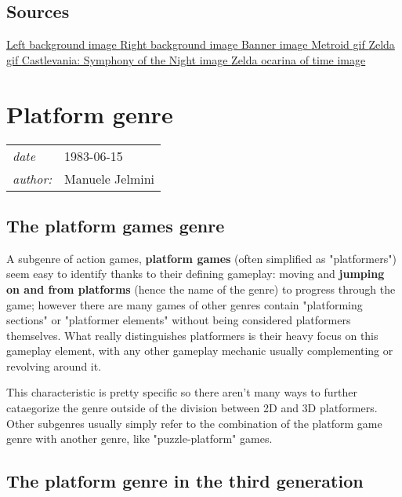 \documentclass[a4paper,10pt]{book}
\newcommand{\pageHeader}[4]{
    \section{#1}
    \vspace{-0.3cm}
    \begin{table}[h!]
     \begin{tabular}{ll}
        \hline
        \textit{date} & #2 \\
        \textit{author: } & #3\\
        \hline
     \end{tabular}
    \end{table}
    \vspace{-0.3cm}
}
\begin{document}
 \subsection{Sources }
 
 \href{https://wallpapercave.com/wp/1fAetMy.jpg}{Left background image }  
 \href{https://wallup.net/wp-content/uploads/2017/11/10/81873-Super_Metroid-Samus_Aran-Metroid.jpg}{Right background image }  
 \href{https://1.bp.blogspot.com/-R0SJfAZjA6Q/VwkYrLqWkaI/AAAAAAAAHQU/agSX_eiWTXYAOQwhgADUZwDyNv2FqXjRA/s640/action-adventure-games.jpg}{Banner image }  
 \href{https://66.media.tumblr.com/2a4ab22c6c0c318c2afd961664983266/tumblr_inline_nfngfjvEF91r2gkqp.gif}{Metroid gif }
 \href{https://habrastorage.org/getpro/habr/post_images/8a5/b0e/51c/8a5b0e51c195fb1e9ba9ca282f54e61a.gif}{Zelda gif }  
 \href{https://cdn.cultofmac.com/wp-content/uploads/2020/03/Castlevania-Symphony-of-the-Night.jpg}{Castlevania: Symphony of the Night image }  
 \href{https://onlysp.escapistmagazine.com/wp-content/uploads/2018/11/Ocarina-of-Time-gameplay.jpg}{Zelda ocarina of time image }  
 
 \newpage\pageHeader{Platform genre}{1983-06-15}{Manuele Jelmini}{The rise of platform games in the third generation}
 \subsection{The platform games genre }
 
 
          A subgenre of action games,  \textbf{platform games }  (often simplified as "platformers") seem easy to identify thanks to their defining gameplay: moving and  \textbf{jumping on and from platforms }  (hence the name of the genre) to progress through the game;
          however there are many games of other genres contain "platforming sections" or "platformer elements" without being considered platformers themselves.
          What really distinguishes platformers is their heavy focus on this gameplay element, with any other gameplay mechanic usually complementing or revolving around it.  
 
          This characteristic is pretty specific so there aren't many ways to further cataegorize the genre outside of the division between 2D and 3D platformers.
          Other subgenres usually simply refer to the combination of the platform game genre with another genre, like "puzzle-platform" games.

         
 
 \subsection{The platform genre in the third generation }
 
\end{document}
